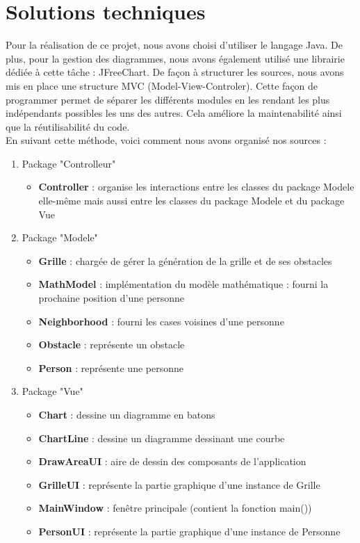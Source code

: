 \documentclass[twoside,UTF8]{EPURapport}
\begin{document}
	
	\section{Solutions techniques}
	Pour la réalisation de ce projet, nous avons choisi d'utiliser le langage Java. De plus, pour la gestion des diagrammes, nous avons également utilisé une librairie dédiée à cette tâche : JFreeChart. De façon à structurer les sources, nous avons mis en place une structure MVC (Model-View-Controler). Cette façon de programmer permet de séparer les différents modules en les rendant les plus indépendants possibles les uns des autres. Cela améliore la maintenabilité ainsi que la réutilisabilité du code.\\
	En suivant cette méthode, voici comment nous avons organisé nos sources :
	
	\begin{enumerate}
		\item Package "Controlleur"
		\begin{itemize}
			\item \textbf{Controller} : organise les interactions entre les classes du package Modele elle-même mais aussi entre les classes du package Modele et du package Vue
		\end{itemize}
		
		\item Package "Modele"
		\begin{itemize}
			\item \textbf{Grille} : chargée de gérer la génération de la grille et de ses obstacles
			\item \textbf{MathModel} : implémentation du modèle mathématique : fourni la prochaine position d'une personne
			\item \textbf{Neighborhood} : fourni les cases voisines d'une personne
			\item \textbf{Obstacle} : représente un obstacle
			\item \textbf{Person} : représente une personne
		\end{itemize}
		
		\item Package "Vue"
		\begin{itemize}
			\item \textbf{Chart} : dessine un diagramme en batons
			\item \textbf{ChartLine} : dessine un diagramme dessinant une courbe
			\item \textbf{DrawAreaUI} : aire de dessin des composants de l'application
			\item \textbf{GrilleUI} : représente la partie graphique d'une instance de Grille 
			\item \textbf{MainWindow} : fenêtre principale (contient la fonction main())
			\item \textbf{PersonUI} : représente la partie graphique d'une instance de Personne
		\end{itemize}
	\end{enumerate}	
	
\end{document}
